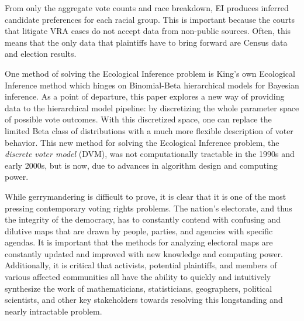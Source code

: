 From only the aggregate vote counts and race breakdown, EI produces inferred candidate preferences for each racial group. This is important because the courts that litigate VRA cases do not accept data from non-public sources. Often, this means that the only data that plaintiffs have to bring forward are Census data and election results.

One method of solving the Ecological Inference problem is King's own Ecological Inference method which hinges on Binomial-Beta hierarchical models for Bayesian inference. As a point of departure, this paper explores a new way of providing data to the hierarchical model pipeline: by discretizing the whole parameter space of possible vote outcomes. With this discretized space, one can replace the limited Beta class of distributions with a much more flexible description of voter behavior. This new method for solving the Ecological Inference problem, the \textit{discrete voter model} (DVM), was not computationally tractable in the 1990s and early 2000s, but is now, due to advances in algorithm design and computing power.

While gerrymandering is difficult to prove, it is clear that it is one of the most pressing contemporary voting rights problems. The nation’s electorate, and thus the integrity of the democracy, has to constantly contend with confusing and dilutive maps that are drawn by people, parties, and agencies with specific agendas. It is important that the methods for analyzing electoral maps are constantly updated and improved with new knowledge and computing power. Additionally, it is critical that activists, potential plaintiffs, and members of various affected communities all have the ability to quickly and intuitively synthesize the work of mathematicians, statisticians, geographers, political scientists, and other key stakeholders towards resolving this longstanding and nearly intractable problem.
